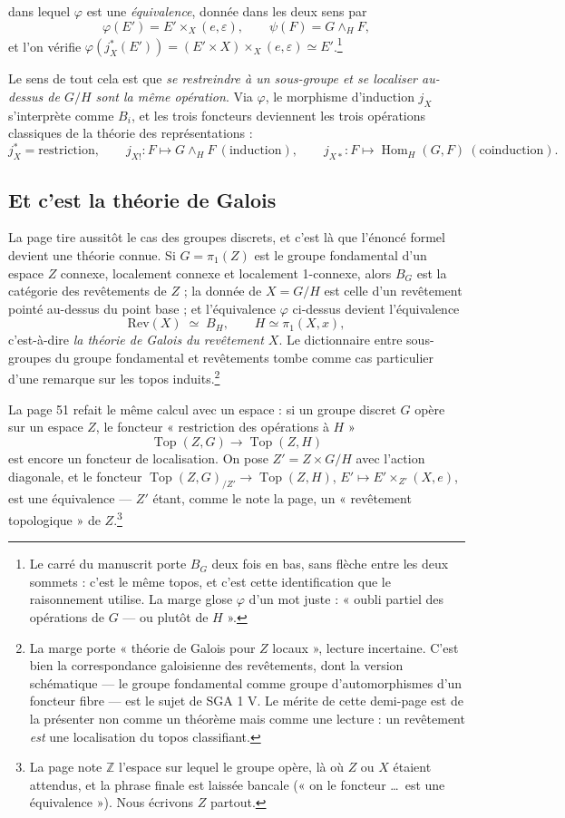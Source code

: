 \documentclass[11pt,a4paper]{article}
\begin{document}
dans lequel $\varphi$ est une \emph{équivalence}, donnée dans les deux sens par
\[
\varphi(E') = E' \times_{X} (e, \varepsilon), \qquad
\psi(F) = G \wedge_{H} F,
\]
et l'on vérifie $\varphi(j_{X}^{*}(E')) = (E' \times X) \times_{X}
(e, \varepsilon) \simeq E'$.\footnote{Le carré du manuscrit porte $B_{G}$ deux
fois en bas, sans flèche entre les deux sommets : c'est le même topos, et
c'est cette identification que le raisonnement utilise. La marge glose
$\varphi$ d'un mot juste : « oubli partiel des opérations de $G$ — ou plutôt de
$H$ ».}

Le sens de tout cela est que \emph{se restreindre à un sous-groupe et se
localiser au-dessus de $G/H$ sont la même opération}. Via $\varphi$, le
morphisme d'induction $j_{X}$ s'interprète comme $B_{i}$, et les trois foncteurs
deviennent les trois opérations classiques de la théorie des représentations :
\[
j_{X}^{*} = \text{restriction}, \qquad
j_{X!} : F \mapsto G \wedge_{H} F \ (\text{induction}), \qquad
j_{X*} : F \mapsto \operatorname{Hom}_{H}(G, F) \ (\text{coinduction}).
\]

\subsection*{Et c'est la théorie de Galois}

La page tire aussitôt le cas des groupes discrets, et c'est là que l'énoncé
formel devient une théorie connue. Si $G = \pi_{1}(Z)$ est le groupe
fondamental d'un espace $Z$ connexe, localement connexe et localement
1-connexe, alors $B_{G}$ est la catégorie des revêtements de $Z$ ; la donnée de
$X = G/H$ est celle d'un revêtement pointé au-dessus du point base ; et
l'équivalence $\varphi$ ci-dessus devient l'équivalence
\[
\mathrm{Rev}(X) \;\simeq\; B_{H}, \qquad H \simeq \pi_{1}(X,x),
\]
c'est-à-dire \emph{la théorie de Galois du revêtement $X$}. Le dictionnaire
entre sous-groupes du groupe fondamental et revêtements tombe comme cas
particulier d'une remarque sur les topos induits.\footnote{La marge porte
« théorie de Galois pour $Z$ locaux », lecture incertaine. C'est bien la
correspondance galoisienne des revêtements, dont la version schématique — le
groupe fondamental comme groupe d'automorphismes d'un foncteur fibre — est le
sujet de SGA 1 V. Le mérite de cette demi-page est de la présenter non comme un
théorème mais comme une lecture : un revêtement \emph{est} une localisation du
topos classifiant.}

La page 51 refait le même calcul avec un espace : si un groupe discret $G$ opère
sur un espace $Z$, le foncteur « restriction des opérations à $H$ »
\[
\operatorname{Top}(Z, G) \longrightarrow \operatorname{Top}(Z, H)
\]
est encore un foncteur de localisation. On pose $Z' = Z \times G/H$ avec
l'action diagonale, et le foncteur
$\operatorname{Top}(Z,G)_{/Z'} \to \operatorname{Top}(Z,H)$, $E' \mapsto E'
\times_{Z'} (X,e)$, est une équivalence — $Z'$ étant, comme le note la page, un
« revêtement topologique » de $Z$.\footnote{La page note $\mathbb{Z}$ l'espace
sur lequel le groupe opère, là où $Z$ ou $X$ étaient attendus, et la phrase
finale est laissée bancale (« on le foncteur \ldots\ est une équivalence »).
Nous écrivons $Z$ partout.}
\end{document}
